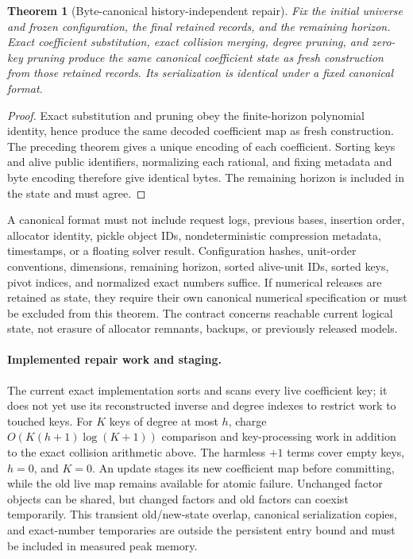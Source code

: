 \documentclass[11pt,a4paper]{article}
\newtheorem{theorem}{Theorem}[section]
\begin{document}
\begin{theorem}[Byte-canonical history-independent repair]
Fix the initial universe and frozen configuration, the final retained
records, and the remaining horizon. Exact coefficient substitution, exact
collision merging, degree pruning, and zero-key pruning produce the same
canonical coefficient state as fresh construction from those retained
records. Its serialization is identical under a fixed canonical format.
\end{theorem}
\begin{proof}
Exact substitution and pruning obey the finite-horizon polynomial
identity, hence produce the same decoded coefficient map as fresh
construction. The preceding theorem gives a unique encoding of each
coefficient. Sorting keys and alive public identifiers, normalizing each
rational, and fixing metadata and byte encoding therefore give identical
bytes. The remaining horizon is included in the state and must agree.
\end{proof}

A canonical format must not include request logs, previous bases, insertion
order, allocator identity, pickle object IDs, nondeterministic compression
metadata, timestamps, or a floating solver result. Configuration hashes,
unit-order conventions, dimensions, remaining horizon, sorted alive-unit
IDs, sorted keys, pivot indices, and normalized exact numbers suffice.
If numerical releases are retained as state, they require their own
canonical numerical specification or must be excluded from this theorem.
The contract concerns reachable current logical state, not erasure of
allocator remnants, backups, or previously released models.

\paragraph{Implemented repair work and staging.}
The current exact implementation sorts and scans every live coefficient key;
it does not yet use its reconstructed inverse and degree indexes to restrict
work to touched keys. For $K$ keys of degree at most $h$, charge
$O(K(h+1)\log(K+1))$ comparison and key-processing work in addition to
the exact collision arithmetic above. The harmless $+1$ terms cover empty
keys, $h=0$, and $K=0$. An update stages its new coefficient map before
committing, while the old live map remains available for atomic failure.
Unchanged factor objects can be shared, but changed factors and old factors
can coexist temporarily. This transient old/new-state overlap, canonical
serialization copies, and exact-number temporaries are outside the persistent
entry bound and must be included in measured peak memory.
\end{document}
